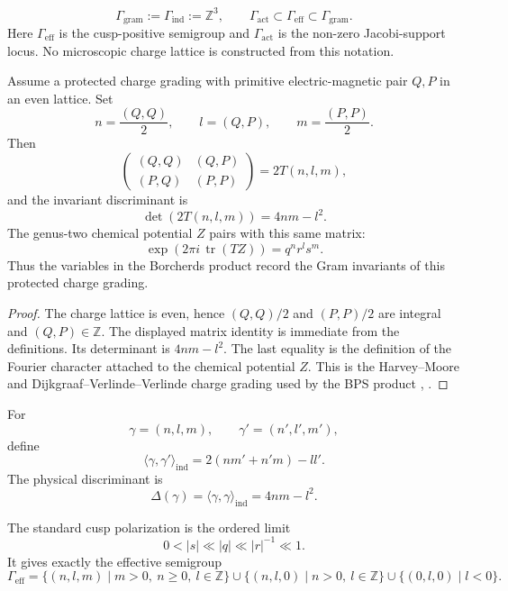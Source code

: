 \documentclass[11pt]{memoir}
\newcommand{\Z}{\mathbb{Z}} \newcommand{\C}{\mathbb{C}}
\begin{document}
\begin{definition}
$$
\Gamma_{\mathrm{gram}}:=\Gamma_{\mathrm{ind}}:=\Z^3,\qquad
\Gamma_{\mathrm{act}}\subset\Gamma_{\mathrm{eff}}\subset\Gamma_{\mathrm{gram}}.
$$
Here \(\Gamma_{\mathrm{eff}}\) is the cusp-positive semigroup and
\(\Gamma_{\mathrm{act}}\) is the non-zero Jacobi-support locus.  No
microscopic charge lattice is constructed from this notation.
\end{definition}

\begin{proposition}
Assume a protected charge grading with primitive electric-magnetic pair
$Q,P$ in an even lattice.  Set
$$
n=\frac{(Q,Q)}2,\qquad l=(Q,P),\qquad m=\frac{(P,P)}2.
$$
Then
$$
\begin{pmatrix}(Q,Q)&(Q,P)\\ (P,Q)&(P,P)\end{pmatrix}
=2T(n,l,m),
$$
and the invariant discriminant is
$$
\det(2T(n,l,m))=4nm-l^2.
$$
The genus-two chemical potential $Z$ pairs with this same matrix:
$$
\exp(2\pi i\,\operatorname{tr}(TZ))=q^nr^ls^m.
$$
Thus the variables in the Borcherds product record the Gram invariants
of this protected charge grading.
\end{proposition}

\begin{proof}
The charge lattice is even, hence $(Q,Q)/2$ and $(P,P)/2$ are integral
and $(Q,P)\in\Z$.  The displayed matrix identity is immediate from the
definitions.  Its determinant is $4nm-l^2$.  The last equality is the
definition of the Fourier character attached to the chemical potential
$Z$.  This is the Harvey--Moore and Dijkgraaf--Verlinde--Verlinde
charge grading used by the BPS product \cite{HM}, \cite{DVV}.
\end{proof}

\begin{definition}
For
$$\gamma=(n,l,m),\qquad \gamma'=(n',l',m'),$$
define
$$
\langle\gamma,\gamma'\rangle_{\mathrm{ind}}
=2(nm'+n'm)-ll'.
$$
The physical discriminant is
$$
\Delta(\gamma)=\langle\gamma,\gamma\rangle_{\mathrm{ind}}
=4nm-l^2.
$$
\end{definition}

\begin{definition}
The standard cusp polarization is the ordered limit
$$0<|s|\ll |q|\ll |r|^{-1}\ll1.$$
It gives exactly the effective semigroup
$$
\Gamma_{\mathrm{eff}}
=\{(n,l,m)\mid m>0,\ n\geq0,\ l\in\Z\}
\cup\{(n,l,0)\mid n>0,\ l\in\Z\}
\cup\{(0,l,0)\mid l<0\}.
$$
\end{definition}
\end{document}
